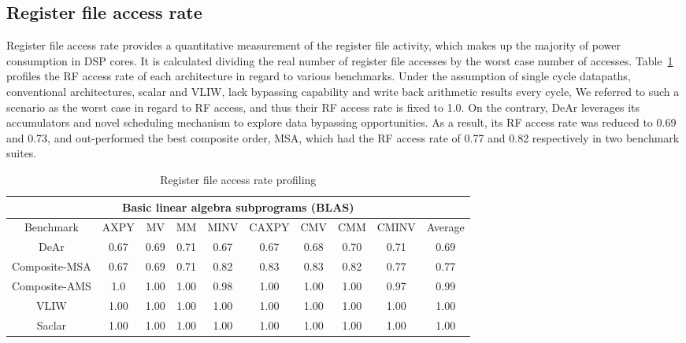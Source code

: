 {    \subsection{Register file access rate}
    Register file access rate provides a quantitative measurement of the register file activity, 
    which makes up the majority of power consumption in DSP cores.
    It is calculated dividing the real number of register file accesses by the worst case number of accesses.
    Table~\ref{tab:rpd} profiles the RF access rate of each architecture in regard to various benchmarks.
    Under the assumption of single cycle datapaths, conventional architectures, scalar and VLIW, 
    lack bypassing capability and write back arithmetic results every cycle, 
    We referred to such a scenario as the worst case in regard to RF access, 
    and thus their RF access rate is fixed to 1.0.
    On the contrary, DeAr leverages its accumulators and novel scheduling mechanism to explore data bypassing opportunities. 
    As a result, its RF access rate was reduced to 0.69 and 0.73, 
    and out-performed the best composite order, MSA, which had the RF access rate of 0.77 and 0.82 respectively in two benchmark suites.
    \begin{table}[!ht]
        \centering
        \caption{Register file access rate profiling}
        \label{tab:rpd}
        \resizebox{\columnwidth}{!}
        {
            \begin{tabular}{|c|c|c|c|c|c|c|c|c|c|}
                \hline
                 \multicolumn{10}{|c|}{\textbf{Basic linear algebra subprograms (BLAS)}} \\ \hline
                Benchmark  &  AXPY  &  MV  &  MM  &  MINV  &  CAXPY  &  CMV  &  CMM  &  CMINV  &  Average \\ \hline 
                DeAr  &   0.67  &   0.69  &   0.71  &   0.67  &   0.67  &   0.68  &   0.70  &   0.71  &   0.69     \\ \hline
                Composite-MSA  &   0.67  &   0.69  &  0.71  &   0.82  &   0.83  &   0.83  &   0.82  &   0.77  &  0.77     \\ \hline 
                Composite-AMS  &   1.0  &   1.00  &   1.00  &   0.98  &   1.00  &   1.00  &   1.00  &   0.97  &   0.99     \\ \hline 
                VLIW  &   1.00  &   1.00  &   1.00  &   1.00  &   1.00  &   1.00  &   1.00  &   1.00  &   1.00     \\ \hline 
                Saclar  &   1.00  &   1.00  &   1.00  &   1.00  &   1.00  &   1.00  &   1.00  &   1.00  &   1.00     \\ \hline 

\end{tabular}}
\end{table}}
